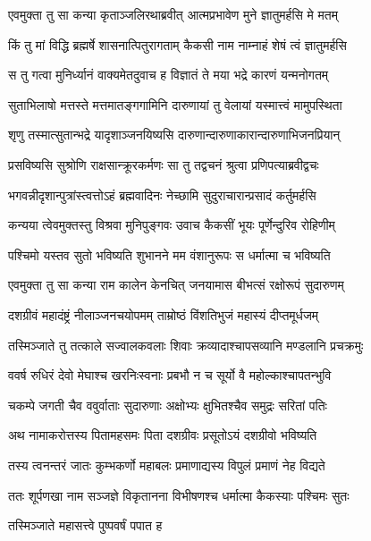 \twolineshloka
{एवमुक्ता तु सा कन्या कृताञ्जलिरथाब्रवीत्}
{आत्मप्रभावेण मुने ज्ञातुमर्हसि मे मतम्} %

\twolineshloka
{किं तु मां विद्धि ब्रह्मर्षे शासनात्पितुरागताम्}
{कैकसी नाम नाम्नाहं शेषं त्वं ज्ञातुमर्हसि} %

\twolineshloka
{स तु गत्वा मुनिर्ध्यानं वाक्यमेतदुवाच ह}
{विज्ञातं ते मया भद्रे कारणं यन्मनोगतम्} %

\twolineshloka
{सुताभिलाषो मत्तस्ते मत्तमातङ्गगामिनि}
{दारुणायां तु वेलायां यस्मात्त्वं मामुपस्थिता} %

\twolineshloka
{शृणु तस्मात्सुतान्भद्रे यादृशाञ्जनयिष्यसि}
{दारुणान्दारुणाकारान्दारुणाभिजनप्रियान्} %

\twolineshloka
{प्रसविष्यसि सुश्रोणि राक्षसान्क्रूरकर्मणः}
{सा तु तद्वचनं श्रुत्वा प्रणिपत्याब्रवीद्वचः} %

\twolineshloka
{भगवन्नीदृशान्पुत्रांस्त्वत्तोऽहं ब्रह्मवादिनः}
{नेच्छामि सुदुराचारान्प्रसादं कर्तुमर्हसि} %

\twolineshloka
{कन्यया त्वेवमुक्तस्तु विश्रवा मुनिपुङ्गवः}
{उवाच कैकसीं भूयः पूर्णेन्दुरिव रोहिणीम्} %

\twolineshloka
{पश्चिमो यस्तव सुतो भविष्यति शुभानने}
{मम वंशानुरूपः स धर्मात्मा च भविष्यति} %

\twolineshloka
{एवमुक्ता तु सा कन्या राम कालेन केनचित्}
{जनयामास बीभत्सं रक्षोरूपं सुदारुणम्} %

\twolineshloka
{दशग्रीवं महादंष्ट्रं नीलाञ्जनचयोपमम्}
{ताम्रोष्ठं विंशतिभुजं महास्यं दीप्तमूर्धजम्} %

\twolineshloka
{तस्मिञ्जाते तु तत्काले सज्वालकवलाः शिवाः}
{क्रव्यादाश्चापसव्यानि मण्डलानि प्रचक्रमुः} %

\twolineshloka
{ववर्ष रुधिरं देवो मेघाश्च खरनिःस्वनाः}
{प्रबभौ न च सूर्यो वै महोल्काश्चापतन्भुवि} %

\twolineshloka
{चकम्पे जगती चैव ववुर्वाताः सुदारुणाः}
{अक्षोभ्यः क्षुभितश्चैव समुद्रः सरितां पतिः} %

\twolineshloka
{अथ नामाकरोत्तस्य पितामहसमः पिता}
{दशग्रीवः प्रसूतोऽयं दशग्रीवो भविष्यति} %

\twolineshloka
{तस्य त्वनन्तरं जातः कुम्भकर्णो महाबलः}
{प्रमाणाद्यस्य विपुलं प्रमाणं नेह विद्यते} %

\twolineshloka
{ततः शूर्पणखा नाम सञ्जज्ञे विकृतानना}
{विभीषणश्च धर्मात्मा कैकस्याः पश्चिमः सुतः} %

\onelineshloka
{तस्मिञ्जाते महासत्त्वे पुष्पवर्षं पपात ह} %

